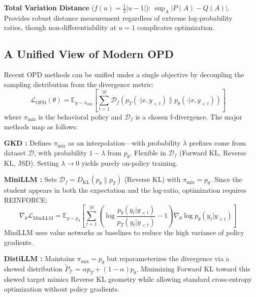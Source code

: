 \documentclass{article} %
\newcommand{\ptheta}{p_\theta}
\newcommand{\pteacher}{p_T}
\newcommand{\loss}{\mathcal{L}}
\begin{document}
\textbf{Total Variation Distance} ($f(u) = \frac{1}{2}|u-1|$): $\sup_A |P(A) - Q(A)|$. Provides robust distance measurement regardless of extreme log-probability ratios, though non-differentiability at $u=1$ complicates optimization.

\subsection{A Unified View of Modern OPD}
\label{subsec:unified_view}

Recent OPD methods can be unified under a single objective by decoupling the sampling distribution from the divergence metric:
\begin{equation}
    \loss_{\mathrm{OPD}}(\theta) = \mathbb{E}_{y \sim \pi_{\mathrm{mix}}} \left[ \sum_{t=1}^{|y|} \mathcal{D}_f \left( \pteacher(\cdot | x, y_{<t}) \parallel \ptheta(\cdot | x, y_{<t}) \right) \right]
\end{equation}
where $\pi_{\mathrm{mix}}$ is the behavioral policy and $\mathcal{D}_f$ is a chosen f-divergence. The major methods map as follows:

\textbf{GKD \citep{2306.13649}:} Defines $\pi_{\mathrm{mix}}$ as an interpolation---with probability $\lambda$ prefixes come from dataset $\mathcal{D}$, with probability $1-\lambda$ from $\ptheta$. Flexible in $\mathcal{D}_f$ (Forward KL, Reverse KL, JSD). Setting $\lambda \to 0$ yields purely on-policy training.

\textbf{MiniLLM \citep{2306.08543}:} Sets $\mathcal{D}_f = D_{\mathrm{KL}}(\ptheta \parallel \pteacher)$ (Reverse KL) with $\pi_{\mathrm{mix}} = \ptheta$. Since the student appears in both the expectation and the log-ratio, optimization requires REINFORCE:
\begin{equation}
    \nabla_\theta \loss_{\mathrm{MiniLLM}} = \mathbb{E}_{y \sim \ptheta} \left[ \sum_{t=1}^{|y|} \left( \log \frac{\ptheta(y_t|y_{<t})}{\pteacher(y_t|y_{<t})} - 1 \right) \nabla_\theta \log \ptheta(y_t|y_{<t}) \right]
\end{equation}
MiniLLM uses value networks as baselines to reduce the high variance of policy gradients.

\textbf{DistiLLM \citep{2402.03898}:} Maintains $\pi_{\mathrm{mix}} = \ptheta$ but reparameterizes the divergence via a skewed distribution $\tilde{P}_{\mathcal{T}} = \alpha \pteacher + (1-\alpha) \ptheta$. Minimizing Forward KL toward this skewed target mimics Reverse KL geometry while allowing standard cross-entropy optimization without policy gradients.
\end{document}

